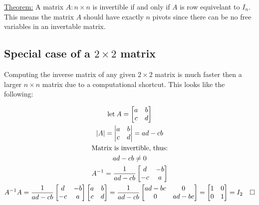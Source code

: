 \documentclass[11pt, a4paper]{article}
\newcommand*{\qed}{\hfill\ensuremath{\quad\square}}%
\begin{document}
\underline{Theorem:}
A matrix $A: n \times n$ is invertible if and only if $A$ is row equivelant to $I_n$.\\

This means the matrix $A$ should have exactly $n$ pivots since there can be no free variables in
an invertable matrix.

\subsection{Special case of a $2 \times 2$ matrix}
Computing the inverse matrix of any given $2 \times 2$ matrix is much faster then a larger
$n \times n$ matrix due to a computational shortcut. This looks like the following:

\begin{gather*}
  \text{let}\:A=
  \begin{bmatrix}
    a & b\\
    c & d\\
  \end{bmatrix}\\
  |A| = 
  \begin{vmatrix}
    a & b\\
    c & d\\
  \end{vmatrix}
  = ad - cb\\
  \text{Matrix is invertible, thus:}\\
  ad - cb \neq 0\\
  A^{-1} = \frac{1}{ad-cb}
  \begin{bmatrix}
    d & -b\\
    -c & a\\
  \end{bmatrix}\\
  A^{-1}A = \frac{1}{ad-cb}
  \begin{bmatrix}
    d & -b\\
    -c & a\\
  \end{bmatrix}
  \begin{bmatrix}
    a & b\\
    c & d\\
  \end{bmatrix}
  =
  \frac{1}{ad-cb}
  \begin{bmatrix}
    ad-bc & 0\\
    0 & ad-bc\\
  \end{bmatrix}
  =
  \begin{bmatrix}
    1 & 0\\
    0 & 1\\
  \end{bmatrix} = I_2 \qed
\end{gather*}
\end{document}
